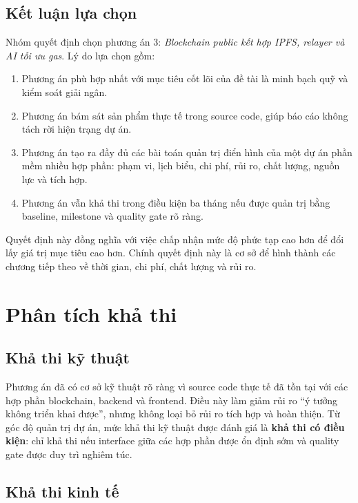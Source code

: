 \subsection{Kết luận lựa chọn}

Nhóm quyết định chọn phương án 3: \textit{Blockchain public kết hợp IPFS, relayer và AI tối ưu gas}. Lý do lựa chọn gồm:

\begin{enumerate}
  \item Phương án phù hợp nhất với mục tiêu cốt lõi của đề tài là minh bạch quỹ và kiểm soát giải ngân.
  \item Phương án bám sát sản phẩm thực tế trong source code, giúp báo cáo không tách rời hiện trạng dự án.
  \item Phương án tạo ra đầy đủ các bài toán quản trị điển hình của một dự án phần mềm nhiều hợp phần: phạm vi, lịch biểu, chi phí, rủi ro, chất lượng, nguồn lực và tích hợp.
  \item Phương án vẫn khả thi trong điều kiện ba tháng nếu được quản trị bằng baseline, milestone và quality gate rõ ràng.
\end{enumerate}

Quyết định này đồng nghĩa với việc chấp nhận mức độ phức tạp cao hơn để đổi lấy giá trị mục tiêu cao hơn. Chính quyết định này là cơ sở để hình thành các chương tiếp theo về thời gian, chi phí, chất lượng và rủi ro.

\section{Phân tích khả thi}

\subsection{Khả thi kỹ thuật}

Phương án đã có cơ sở kỹ thuật rõ ràng vì source code thực tế đã tồn tại với các hợp phần blockchain, backend và frontend. Điều này làm giảm rủi ro “ý tưởng không triển khai được”, nhưng không loại bỏ rủi ro tích hợp và hoàn thiện. Từ góc độ quản trị dự án, mức khả thi kỹ thuật được đánh giá là \textbf{khả thi có điều kiện}: chỉ khả thi nếu interface giữa các hợp phần được ổn định sớm và quality gate được duy trì nghiêm túc.

\subsection{Khả thi kinh tế}

